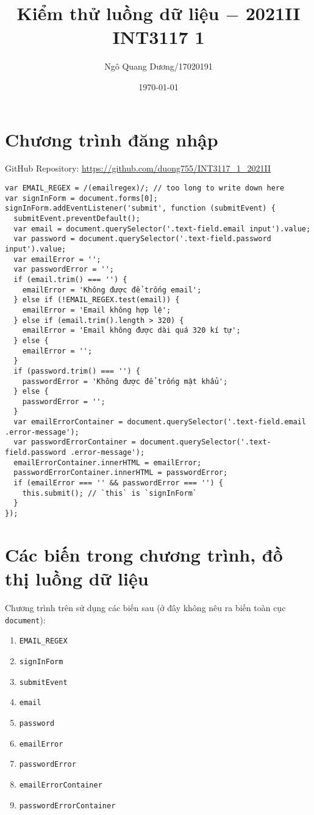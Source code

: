 \documentclass{article}
\title{\bf Kiểm thử luồng dữ liệu $-$ 2021II INT3117 1}
\author{Ngô Quang Dương/17020191}
\date{\today}
\begin{document}
\maketitle

\section{Chương trình đăng nhập}

\par GitHub Repository: \url{https://github.com/duong755/INT3117_1_2021II}

\begin{verbatim}
var EMAIL_REGEX = /(emailregex)/; // too long to write down here
var signInForm = document.forms[0];
signInForm.addEventListener('submit', function (submitEvent) {
  submitEvent.preventDefault();
  var email = document.querySelector('.text-field.email input').value;
  var password = document.querySelector('.text-field.password input').value;
  var emailError = '';
  var passwordError = '';
  if (email.trim() === '') {
    emailError = 'Không được để trống email';
  } else if (!EMAIL_REGEX.test(email)) {
    emailError = 'Email không hợp lệ';
  } else if (email.trim().length > 320) {
    emailError = 'Email không được dài quá 320 kí tự';
  } else {
    emailError = '';
  }
  if (password.trim() === '') {
    passwordError = 'Không được để trống mật khẩu';
  } else {
    passwordError = '';
  }
  var emailErrorContainer = document.querySelector('.text-field.email .error-message');
  var passwordErrorContainer = document.querySelector('.text-field.password .error-message');
  emailErrorContainer.innerHTML = emailError;
  passwordErrorContainer.innerHTML = passwordError;
  if (emailError === '' && passwordError === '') {
    this.submit(); // `this` is `signInForm`
  }
});
\end{verbatim}

\section{Các biến trong chương trình, đồ thị luồng dữ liệu}

\par Chương trình trên sử dụng các biến sau (ở đây không nêu ra biến toàn cục \texttt{document}):
\bigskip
\begin{enumerate}[label = (v\arabic*)]
    \item \texttt{EMAIL\_REGEX}
    \item \texttt{signInForm}
    \item \texttt{submitEvent}
    \item \texttt{email}
    \item \texttt{password}
    \item \texttt{emailError}
    \item \texttt{passwordError}
    \item \texttt{emailErrorContainer}
    \item \texttt{passwordErrorContainer}
\end{enumerate}
\end{document}
